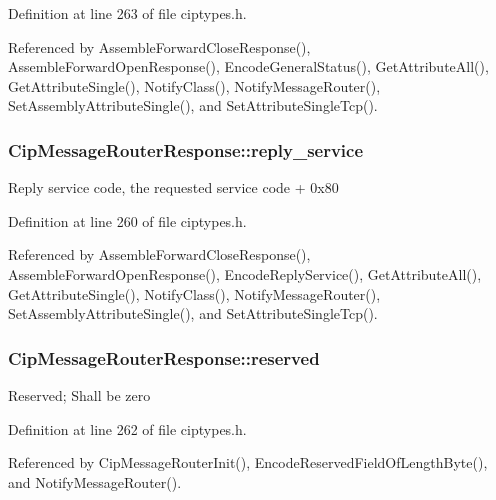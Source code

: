 \-Definition at line 263 of file ciptypes.\-h.



\-Referenced by \-Assemble\-Forward\-Close\-Response(), \-Assemble\-Forward\-Open\-Response(), \-Encode\-General\-Status(), \-Get\-Attribute\-All(), \-Get\-Attribute\-Single(), \-Notify\-Class(), \-Notify\-Message\-Router(), \-Set\-Assembly\-Attribute\-Single(), and \-Set\-Attribute\-Single\-Tcp().

\hypertarget{structCipMessageRouterResponse_a9bedd472cae3ed195d6fa894133bec6b}{
\subsubsection[{reply\-\_\-service}]{ {\bf \-Cip\-Message\-Router\-Response\-::reply\-\_\-service}}}\label{d0/d1f/structCipMessageRouterResponse_a9bedd472cae3ed195d6fa894133bec6b}
\-Reply service code, the requested service code + 0x80 

\-Definition at line 260 of file ciptypes.\-h.



\-Referenced by \-Assemble\-Forward\-Close\-Response(), \-Assemble\-Forward\-Open\-Response(), \-Encode\-Reply\-Service(), \-Get\-Attribute\-All(), \-Get\-Attribute\-Single(), \-Notify\-Class(), \-Notify\-Message\-Router(), \-Set\-Assembly\-Attribute\-Single(), and \-Set\-Attribute\-Single\-Tcp().

\hypertarget{structCipMessageRouterResponse_a76f1726a4fd8935f13ef55e6393398a9}{
\subsubsection[{reserved}]{ {\bf \-Cip\-Message\-Router\-Response\-::reserved}}}\label{d0/d1f/structCipMessageRouterResponse_a76f1726a4fd8935f13ef55e6393398a9}
\-Reserved; \-Shall be zero 

\-Definition at line 262 of file ciptypes.\-h.



\-Referenced by \-Cip\-Message\-Router\-Init(), \-Encode\-Reserved\-Field\-Of\-Length\-Byte(), and \-Notify\-Message\-Router().


